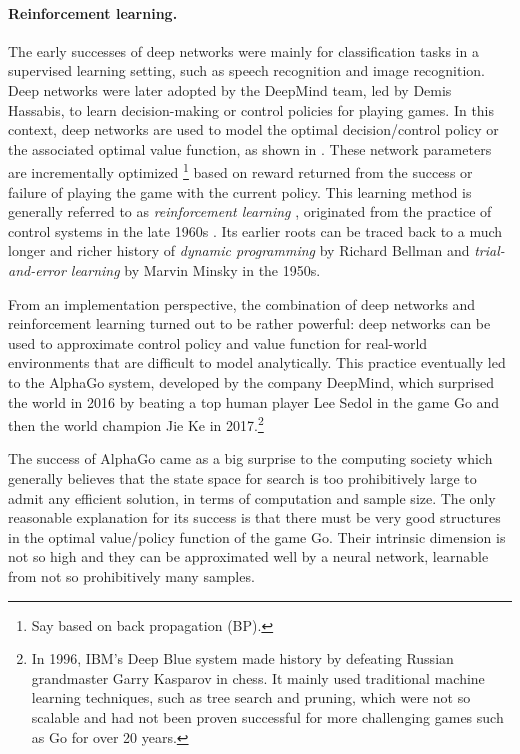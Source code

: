 \documentclass[../../book-main.tex]{subfiles}
\begin{document}
\paragraph{Reinforcement learning.}
The early successes of deep networks were mainly for classification tasks in a supervised learning setting, such as speech recognition and image recognition. Deep networks were later adopted by the DeepMind team, led by Demis Hassabis, to learn decision-making or control policies for playing games. In this context, deep networks are used to model the optimal decision/control policy or the associated optimal value function, as shown in . These network parameters are incrementally optimized \footnote{Say based on back propagation (BP).} based on reward returned from the success or failure of playing the game with the current policy. This learning method is generally referred to as {\em reinforcement learning} \cite{Sutton-Barto}, originated from the practice of control systems in the late 1960s \cite{Waltz1965AHA,Mendel1970ReinforcementlearningCA}. Its earlier roots can be traced back to a much longer and richer history of {\em dynamic programming} by Richard Bellman \cite{Bellman-DP} and {\em trial-and-error learning} by Marvin Minsky \cite{Minsky-1954} in the 1950s. 

From an implementation perspective, the combination of deep networks and reinforcement learning turned out to be rather powerful: deep networks can be used to approximate control policy and value function for real-world environments that are difficult to model analytically. This practice eventually led to the AlphaGo system, developed by the company DeepMind, which surprised the world in 2016 by beating a top human player Lee Sedol in the game Go and then the world champion Jie Ke in 2017.\footnote{In 1996, IBM's Deep Blue system made history by defeating Russian grandmaster Garry Kasparov in chess. It mainly used traditional machine learning techniques, such as tree search and pruning, which were not so scalable and had not been proven successful for more challenging games such as Go for over 20 years.} 

The success of AlphaGo came as a big surprise to the computing society which generally believes that the state space for search is too prohibitively large to admit any efficient solution, in terms of computation and sample size. The only reasonable explanation for its success is that there must be very good structures in the optimal value/policy function of the game Go. Their intrinsic dimension is not so high and they can be approximated well by a neural network, learnable from not so prohibitively many samples. 
\end{document}

